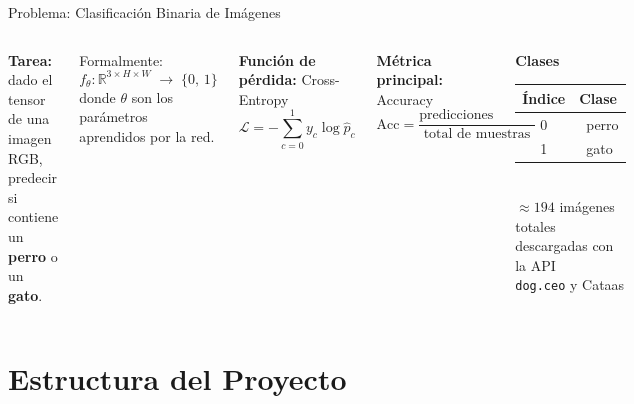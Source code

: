 \documentclass[aspectratio=169,10pt]{beamer}
\newcommand{\faIcon}[1]{\textbullet}
\begin{document}
\begin{frame}{Problema: Clasificación Binaria de Imágenes}
    \begin{columns}
        \textbf{Tarea:} dado el tensor de una imagen RGB,\\
        predecir si contiene un \textbf{perro} o un \textbf{gato}.

        \vspace{8pt}
        Formalmente:
        \[
            f_\theta : \mathbb{R}^{3 \times H \times W} \;\longrightarrow\; \{0,\, 1\}
        \]
        donde $\theta$ son los parámetros aprendidos por la red.

        \vspace{8pt}
        \textbf{Función de pérdida:} Cross-Entropy
        \[
            \mathcal{L} = -\sum_{c=0}^{1} y_c \log \hat{p}_c
        \]

        \vspace{4pt}
        \textbf{Métrica principal:} Accuracy
        \[
            \text{Acc} = \frac{\text{predicciones correctas}}{\text{total de muestras}}
        \]

        \begin{tcolorbox}[colback=lightgray, colframe=gray!50]
            \centering
            \small
            \textbf{Clases}\\[6pt]
            \begin{tabular}{cl}
                \toprule
                Índice & Clase \\
                \midrule
                0 & \faIcon{dog}\ perro \\
                1 & \faIcon{cat}\ gato  \\
                \bottomrule
            \end{tabular}\\[8pt]
            \small $\approx 194$ imágenes totales\\
            descargadas con la API\\
            \texttt{dog.ceo} y Cataas
        \end{tcolorbox}
    \end{columns}
\end{frame}

\section{Estructura del Proyecto}
\end{document}
